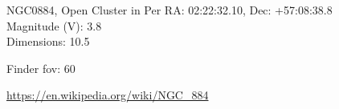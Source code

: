 \begin{block}{NGC0884, Open Cluster in Per}
    RA: 02:22:32.10, Dec: +57:08:38.8 \\ 
    Magnitude (V): 3.8 \\ 
    Dimensions: 10.5 

    Finder fov: 60 

    \url{https://en.wikipedia.org/wiki/NGC_884} 
\end{block}